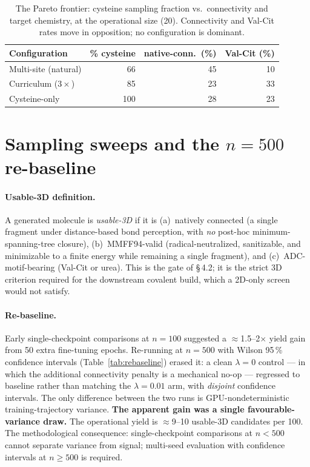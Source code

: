 \documentclass[10pt]{article}
\begin{document}
\begin{table}[t]
\caption{The Pareto frontier: cysteine sampling fraction vs.\ connectivity and target chemistry, at the
operational size (20). Connectivity and Val-Cit rates move in opposition; no configuration is dominant.}
\label{tab:pareto}
\centering\small
\begin{tabular}{@{}lrrr@{}}
\toprule
\rowcolor{tint}Configuration & \% cysteine & native-conn.\ (\%) & Val-Cit (\%) \\
\midrule
Multi-site (natural)   & 66  & 45 & 10 \\
Curriculum ($3\times$) & 85  & 23 & 33 \\
Cysteine-only          & 100 & 28 & 23 \\
\bottomrule
\end{tabular}
\end{table}

\section{Sampling sweeps and the $n{=}500$ re-baseline}
\label{si:sweeps}

\paragraph{Usable-3D definition.}
A generated molecule is \emph{usable-3D} if it is (a)~natively connected (a single fragment under
distance-based bond perception, with \emph{no} post-hoc minimum-spanning-tree closure), (b)~MMFF94-valid
(radical-neutralized, sanitizable, and minimizable to a finite energy while remaining a single fragment),
and (c)~ADC-motif-bearing (Val-Cit or urea). This is the gate of \S\,4.2; it is the strict 3D criterion
required for the downstream covalent build, which a 2D-only screen would not satisfy.

\paragraph{Re-baseline.}
Early single-checkpoint comparisons at $n{=}100$ suggested a $\approx$1.5--2$\times$ yield gain from 50
extra fine-tuning epochs. Re-running at $n{=}500$ with Wilson 95\,\% confidence intervals
(Table~\ref{tab:rebaseline}) erased it: a clean $\lambda{=}0$ control --- in which the additional
connectivity penalty is a mechanical no-op --- regressed to baseline rather than matching the $\lambda{=}0.01$
arm, with \emph{disjoint} confidence intervals. The only difference between the two runs is
GPU-nondeterministic training-trajectory variance. \textbf{The apparent gain was a single
favourable-variance draw.} The operational yield is $\approx$9--10 usable-3D candidates per 100. The
methodological consequence: single-checkpoint comparisons at $n{<}500$ cannot separate variance from
signal; multi-seed evaluation with confidence intervals at $n{\geq}500$ is required.
\end{document}
